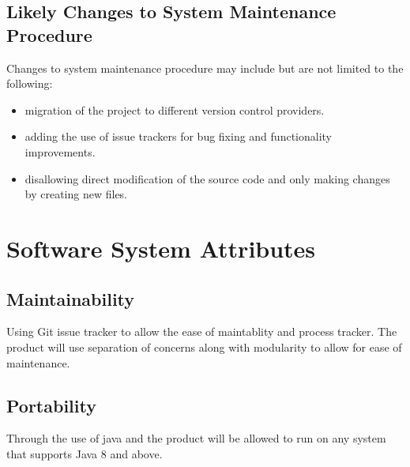 \documentclass{article}
\begin{document}
        \subsection{Likely Changes to System Maintenance Procedure}
            Changes to system maintenance procedure may include but are not limited to the following:
    \begin{itemize}
    \item migration of the project to different version control providers.
    \item adding the use of issue trackers for bug fixing and functionality improvements.
    \item disallowing direct modification of the source code and only making changes by creating new files.
    \end{itemize}
    



\section{Software System Attributes}
\subsection{Maintainability}
Using Git issue tracker to allow the ease of maintablity and process tracker. The product will use separation of concerns along with modularity to allow for ease of maintenance.
\subsection{Portability}
Through the use of java and the product will be allowed to run on any system that supports Java 8 and above.
\end{document}
